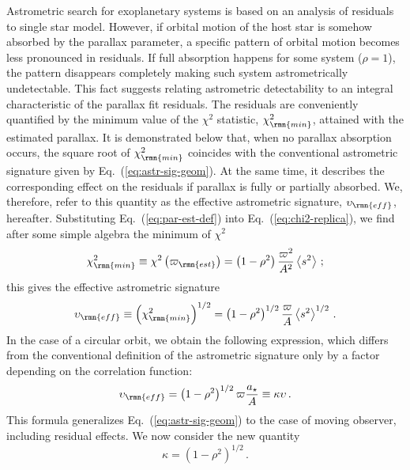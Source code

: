 \documentclass[fleqn,usenatbib,useAMS,usedcolumn]{mnras}
\begin{document}
Astrometric search for exoplanetary systems is based on an analysis of residuals to single star model. However, if orbital motion of the host star is somehow absorbed by the parallax parameter, a specific pattern of orbital motion becomes less pronounced in residuals. If full absorption happens for some system ($\rho=1$), the pattern disappears completely making such system astrometrically undetectable. This fact suggests relating astrometric detectability to an integral characteristic of the parallax fit residuals. The residuals are conveniently quantified by the minimum value of the $\chi^2$ statistic, $\chi_\rmn{min}^2$, attained with the estimated parallax. It is demonstrated below that, when no parallax absorption occurs, the square root of $\chi_\rmn{min}^2$ coincides with the conventional astrometric signature given by Eq.~(\ref{eq:astr-sig-geom}). At the same time, it describes the corresponding effect on the residuals if parallax is fully or partially absorbed. We, therefore, refer to this quantity as the effective astrometric signature, $\upsilon_\rmn{eff}$, hereafter. Substituting Eq.~(\ref{eq:par-est-def}) into Eq.~(\ref{eq:chi2-replica}), we find after some simple algebra the minimum of $\chi^2$
\begin{equation}\label{eq:chi2min}
  \chi_\rmn{min}^2\equiv\chi^2\left(\varpi_\rmn{est}\right)=
  \left(1-\rho^2\right)
  \frac{\varpi^2}{A^2}\left\langle s^2\right\rangle\,;
\end{equation}
this gives the effective astrometric signature
\begin{equation}\label{eq:astr-sig-def}
  \upsilon_\rmn{eff}\equiv
  \left(\chi_\rmn{min}^2\right)^{1/2}=
  \left(1-\rho^2\right)^{1/2}\frac{\varpi}{A}
  \left\langle s^2\right\rangle^{1/2}\,.
\end{equation}
In the case of a circular orbit, we obtain the following expression, which differs from the conventional definition of the astrometric signature only by a factor depending on the correlation function:
\begin{equation}\label{eq:astr-sig-eff}
  \upsilon_\rmn{eff}
  =\left(1-\rho^2\right)^{1/2}\varpi\frac{a_\star}{A}
  \equiv\kappa\upsilon\,.
\end{equation}
This formula generalizes Eq.~(\ref{eq:astr-sig-geom}) to the case of moving observer, including residual effects. We now consider the new quantity
\begin{equation}\label{eq:susceptibility}
  \kappa=\left(1-\rho^2\right)^{1/2}\,.
\end{equation}
\end{document}
